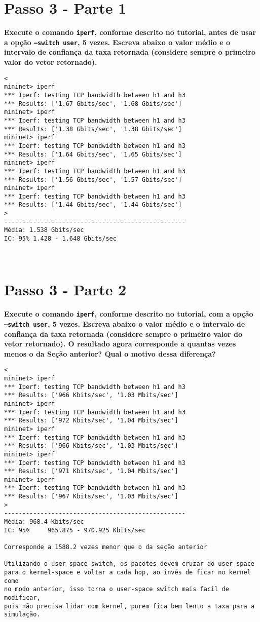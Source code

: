 \documentclass[12pt,letterpaper]{article}
\begin{document}
\section{Passo 3 - Parte 1}

\textbf{Execute o comando \texttt{iperf}, conforme descrito no
tutorial, antes de usar a opção \texttt{--switch user}, 5 vezes.
Escreva abaixo o valor médio e o intervalo de confiança da taxa
retornada (considere sempre o primeiro valor do vetor retornado).}
\begin{verbatim}
<
mininet> iperf
*** Iperf: testing TCP bandwidth between h1 and h3
*** Results: ['1.67 Gbits/sec', '1.68 Gbits/sec']
mininet> iperf
*** Iperf: testing TCP bandwidth between h1 and h3
*** Results: ['1.38 Gbits/sec', '1.38 Gbits/sec']
mininet> iperf
*** Iperf: testing TCP bandwidth between h1 and h3
*** Results: ['1.64 Gbits/sec', '1.65 Gbits/sec']
mininet> iperf
*** Iperf: testing TCP bandwidth between h1 and h3
*** Results: ['1.56 Gbits/sec', '1.57 Gbits/sec']
mininet> iperf
*** Iperf: testing TCP bandwidth between h1 and h3
*** Results: ['1.44 Gbits/sec', '1.44 Gbits/sec']
>
--------------------------------------------------
Média: 1.538 Gbits/sec
IC: 95%	1.428 - 1.648 Gbits/sec



\end{verbatim}
\section{Passo 3 - Parte 2}

\textbf{Execute o comando \texttt{iperf}, conforme descrito no
tutorial, com a opção \texttt{--switch user}, 5 vezes. Escreva abaixo
o valor médio e o intervalo de confiança da taxa retornada (considere
sempre o primeiro valor do vetor retornado). O resultado agora
corresponde a quantas vezes menos o da Seção anterior? Qual o motivo
dessa diferença?}
\begin{verbatim}
<
mininet> iperf
*** Iperf: testing TCP bandwidth between h1 and h3
*** Results: ['966 Kbits/sec', '1.03 Mbits/sec']
mininet> iperf
*** Iperf: testing TCP bandwidth between h1 and h3
*** Results: ['972 Kbits/sec', '1.04 Mbits/sec']
mininet> iperf
*** Iperf: testing TCP bandwidth between h1 and h3
*** Results: ['966 Kbits/sec', '1.03 Mbits/sec']
mininet> iperf
*** Iperf: testing TCP bandwidth between h1 and h3
*** Results: ['971 Kbits/sec', '1.04 Mbits/sec']
mininet> iperf
*** Iperf: testing TCP bandwidth between h1 and h3
*** Results: ['967 Kbits/sec', '1.03 Mbits/sec']
>
--------------------------------------------------
Média: 968.4 Kbits/sec
IC: 95%		965.875 - 970.925 Kbits/sec

Corresponde a 1588.2 vezes menor que o da seção anterior

Utilizando o user-space switch, os pacotes devem cruzar do user-space
para o kernel-space e voltar a cada hop, ao invés de ficar no kernel como 
no modo anterior, isso torna o user-space switch mais facil de modificar, 
pois não precisa lidar com kernel, porem fica bem lento a taxa para a 
simulação.

\end{verbatim}
\end{document}
